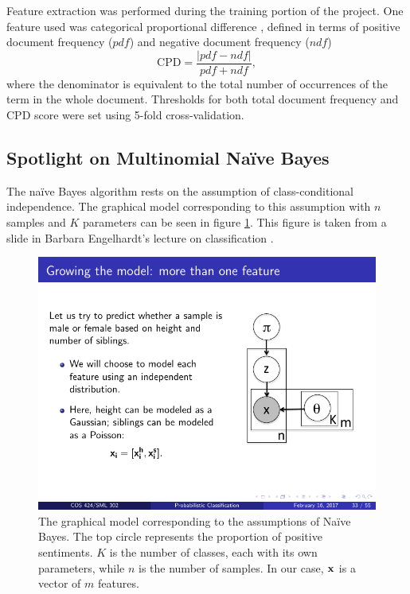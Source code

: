 \documentclass{article} %
\begin{document}
	Feature extraction was performed during the training portion of the project. One feature used was categorical proportional difference \cite{oKeefe2009}, defined in terms of positive document frequency ($pdf$) and negative document frequency ($ndf$)
	\begin{equation}
	\mbox{CPD} = \frac{|pdf - ndf|}{pdf + ndf},
	\end{equation}
	where the denominator is equivalent to the total number of occurrences of the term in the whole document. Thresholds for both total document frequency and CPD score were set using 5-fold cross-validation.
	
	\subsection{Spotlight on Multinomial Na\"ive Bayes}
	
	The na\"ive Bayes algorithm rests on the assumption of class-conditional independence. The graphical model corresponding to this assumption with $n$ samples and $K$ parameters can be seen in figure \ref{fig:dag}. This figure is taken from a slide in Barbara Engelhardt's lecture on classification \cite{engelhardt17}.
	
	\begin{figure}
		\centering
		\includegraphics[scale=1]{DAG}
		\caption{The graphical model corresponding to the assumptions of Na\"ive Bayes. The top circle represents the proportion of positive sentiments. $K$ is the number of classes, each with its own parameters, while $n$ is the number of samples. In our case, $\bf x$ is a vector of $m$ features.}
		\label{fig:dag}
	\end{figure}
	
\end{document}
